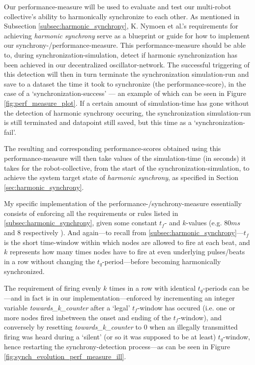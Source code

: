 		Our performance-measure will be used to evaluate and test our multi-robot collective's ability to harmonically synchronize to each other. As mentioned in Subsection \ref{subsec:harmonic_synchrony}, K. Nymoen et al.'s requirements for achieving \textit{harmonic synchrony} serve as a blueprint or guide for how to implement our synchrony-/performance-measure. This performance-measure should be able to, during synchronization-simulation, detect if harmonic synchronization has been achieved in our decentralized oscillator-network. The successful triggering of this detection will then in turn terminate the synchronization simulation-run and save to a dataset the time it took to synchronize (the performance-score), in the case of a `synchronization-success' — an example of which can be seen in Figure \ref{fig:perf_measure_plot}. If a certain amount of simulation-time has gone without the detection of harmonic synchrony occuring, the synchronization simulation-run is still terminated and datapoint still saved, but this time as a `synchronization-fail'.

		The resulting and corresponding performance-scores obtained using this performance-measure will then take values of the simulation-time (in seconds) it takes for the robot-collective, from the start of the synchronization-simulation, to achieve the system target state of \textit{harmonic synchrony}, as specified in Section \ref{sec:harmonic_synchrony}.

		My specific implementation of the performance-/synchrony-measure essentially consists of enforcing all the requirements or rules listed in \ref{subsec:harmonic_synchrony}, given some constant $t_f$- and $k$-values (e.g. $80ms$ and $8$ respectively \cite{nymoen_synch}). And again—to recall from \ref{subsec:harmonic_synchrony}—$t_f$ is the short time-window within which nodes are allowed to fire at each beat, and $k$ represents how many times nodes have to fire at even underlying pulses/beats in a row without changing the $t_q$-period—before becoming harmonically synchronized.

		The requirement of firing evenly $k$ times in a row with identical $t_q$-periods can be—and in fact is in our implementation—enforced by incrementing an integer variable \textit{towards\_k\_counter} after a `legal' $t_f$-window has occured (i.e. one or more nodes fired inbetween the onset and ending of the $t_f$-window), and conversely by resetting \textit{towards\_k\_counter} to 0 when an illegally transmitted firing was heard during a `silent' (or so it was supposed to be at least) $t_q$-window, hence restarting the synchrony-detection process—as can be seen in Figure \ref{fig:synch_evolution_perf_measure_ill}.

